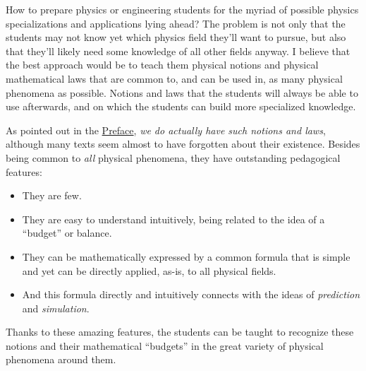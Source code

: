 \documentclass[a4paper,12pt,%
onecolumn,oneside,titlepage,%
british%
]{memoir}
\renewcommand*{\|}[1][]{\nonscript\:#1\vert\nonscript\:\mathopen{}}
\begin{document}
How to prepare physics or engineering students for the myriad of possible physics specializations and applications lying ahead? The problem is not only that the students may not know yet which physics field they'll want to pursue, but also that they'll likely need some knowledge of all other fields anyway. I believe that the best approach would be to teach them physical notions and physical mathematical laws that are common to, and can be used in, as many physical phenomena as possible. Notions and laws that the students will always be able to use afterwards, and on which the students can build more specialized knowledge.

As pointed out in the \hyperref[cha:preface]{Preface}, \emph{we do actually have such notions and laws}, although many texts seem almost to have forgotten about their existence.
Besides being common to \emph{all} physical phenomena, they have outstanding pedagogical features:
\begin{itemize}
\item They are few.
\item They are easy to understand intuitively, being related to the idea of a \enquote{budget} or balance.
\item They can be mathematically expressed by a common formula that is simple and yet can be directly applied, as-is, to all physical fields.
\item And this formula directly and intuitively connects with the ideas of \emph{prediction} and \emph{simulation}.
\end{itemize}
Thanks to these amazing features, the students can be taught to recognize these notions and their mathematical \enquote{budgets} in the great variety of physical phenomena around them.
\end{document}
